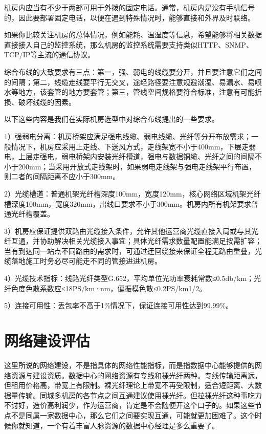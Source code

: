 \documentclass[12pt,UTF8]{ctexbook}
\begin{document}
机房内应当有不少于两部可用于外拨的固定电话。通常，机房内是没有手机信号的，因此要部署固定电话，以便在遇到特殊情况时，能够直接和外界及时联络。

如果你比较关注机房的总体情况，例如能耗、温湿度等信息，希望能够将相关数据直接接入自己的监控系统，那么机房的监控系统需要支持类似HTTP、SNMP、TCP/IP等主流的通信协议。

综合布线的大致要求有三点：第一，强、弱电的线缆要分开，并且要注意它们之间的间隔；第二，线缆走线要平行无交叉，途经路径要注意规避潮湿、易漏水、易喷水等地方，该套管的地方要套管；第三，管线空间规格要符合标准，注意有可能折损、破坏线缆的因素。

以下这些内容是我们在实际机房选型中对综合布线提出的一些要求。

1）强弱电分离：机房桥架应满足强电线缆、弱电线缆、光纤等分开布放需求；一般情况下，机房应采用上走线、下送风方式，走线架宽不小于400mm，下层走弱电，上层走强电，弱电桥架内安装光纤槽道，强电与数据铜缆、光纤之间的间隔不小于200mm；当采用开放式走线架时，如果弱电走线架与强电走线架平行布置，则二者的间隔距离不应小于300mm。

2）光缆槽道：普通机架光纤槽深度100mm，宽度120mm，核心网络区域机架光纤槽深度100mm，宽度320mm，出线口要求不小于300mm。机房内所有机架要求普通光纤槽覆盖。

3）机房应保证提供双路由光缆接入条件，允许其他运营商光缆直接入局或与其光纤互通，并协助解决相关光缆接入事宜；具体光纤需求数量配置能满足按需扩容；当有到达同一站点不同路由的需求时，可通过迂回绕接来保证全程无路由重叠，光缆落地施工时务必尽可能走不同的管接进进机房。

4）光缆技术指标：线路光纤类型G.652，平均单位光功率衰耗常数≤0.5db/km；光纤色度色散系数应≤18PS/km·nm，偏振模色散≤0.2PS/km1/2。

5）连接可用性：丢包率不高于1\%情况下，保证连接可用性达到99.99\%。

\section{网络建设评估}

这里所说的网络建设，不是指具体的网络性能指标，而是指数据中心能够提供的网络资源与建设资质。数据中心的网络资源有专线和裸光纤两种。专线传输距离远，但租用价格高，带宽上有限制。裸光纤理论上带宽不再受限制，适合短距离、大数据量传输。同城多机房的各节点之间互通建议使用裸光纤。但拉裸光纤这种事吃力不讨好，造价高利润少，作为运营商，肯定是不会随便开这个口子的。如果这些节点不是同属一家数据中心，那么它们之间要实现互通，可能就更加困难了。这个时候你就知道，一个有着丰富人脉资源的数据中心经理是多么重要了。
\end{document}
